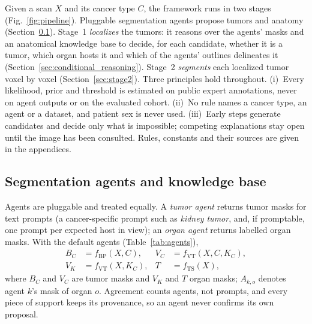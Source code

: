 \documentclass[fleqn,10pt]{olplainarticle}
\begin{document}
Given a scan $X$ and its cancer type $C$, the framework runs in two stages (Fig.~\ref{fig:pipeline}). Pluggable
segmentation agents propose tumors and anatomy (Section~\ref{sec:agents}). Stage~1 \emph{localizes} the tumors: it
reasons over the agents' masks and an anatomical knowledge base to decide, for each candidate, whether it is a tumor,
which organ hosts it and which of the agents' outlines delineates it (Section~\ref{sec:conditional_reasoning}). Stage~2
\emph{segments} each localized tumor voxel by voxel (Section~\ref{sec:stage2}). Three principles hold throughout.
(i)~Every likelihood, prior and threshold is estimated on public expert annotations, never on agent outputs or on the
evaluated cohort. (ii)~No rule names a cancer type, an agent or a dataset, and patient sex is never used. (iii)~Early steps
generate candidates and decide only what is impossible; competing explanations stay open until the image has been
consulted. Rules, constants and their sources are given in the appendices.

\subsection{Segmentation agents and knowledge base}
\label{sec:agents}
Agents are pluggable and treated equally. A \emph{tumor agent} returns tumor masks for text prompts (a cancer-specific
prompt such as \emph{kidney tumor}, and, if promptable, one prompt per expected host in view); an \emph{organ agent} returns
labelled organ masks. With the default agents (Table~\ref{tab:agents}),
\begin{equation}
\label{eq:agents}
\begin{aligned}
B_C&=f_{\mathrm{BP}}(X,C), & V_C&=f_{\mathrm{VT}}(X,C,K_C),\\
V_K&=f_{\mathrm{VT}}(X,K_C), & T&=f_{\mathrm{TS}}(X),
\end{aligned}
\end{equation}
where $B_C$ and $V_C$ are tumor masks and $V_K$ and $T$ organ masks; $A_{k,o}$ denotes agent $k$'s mask of organ $o$.
Agreement counts agents, not prompts, and every piece of support keeps its provenance, so an agent never confirms its own
proposal.
\end{document}
